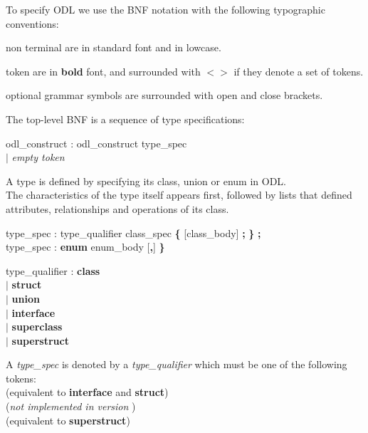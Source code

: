 
To specify ODL we use the BNF notation with the following typographic
conventions:
\begin{list}{-}{{\itemsep 0mm}} %
\item non terminal are in standard font and in lowcase.
\item token are in {\bf bold} font, and surrounded with {\bf $<$$>$} if they
denote a set of tokens.
\item optional grammar symbols are surrounded with open and close brackets.
\end{list}

The top-level BNF is a sequence of type specifications:
\begin{tabbing}
\grindent
odl\_construct \> : odl\_construct type\_spec\\
\> $|$ \emph{empty token}
\end{tabbing}


A type is defined by specifying its class, union or enum in ODL.\\
The characteristics of the type itself appears first, followed by
lists that defined attributes, relationships and operations of its
class.
\begin{tabbing}
\grindent
type\_spec \> : type\_qualifier class\_spec {\bf \{} [class\_body] {\bf ;} {\bf \}} {\bf ;}\\
type\_spec \> : {\bf enum}  enum\_body [{\bf ,}] {\bf \}}
\end{tabbing}


\begin{tabbing}
\grindent
type\_qualifier \> : {\bf class}\\
\> $|$ {\bf struct}\\
\> $|$ {\bf union}\\
\> $|$ {\bf interface}\\
\> $|$ {\bf superclass}\\
\> $|$ {\bf superstruct}
\end{tabbing}
A \emph{type\_spec} is denoted by a \emph{type\_qualifier} which must be one
of the following tokens:\\
 (equivalent to {\bf interface} and {\bf struct})\\
 (\emph{not implemented in version \eyedbversion})\\
 (equivalent to {\bf superstruct})

